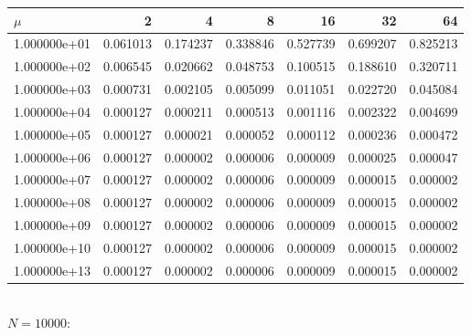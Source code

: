 \documentclass[11pt,a4paper]{report}
\begin{document}
\begin{tabular}{lrrrrrr}
\toprule
{} $\mu$&        2  &        4  &        8  &        16 &        32 &        64 \\
\midrule
1.000000e+01 &  0.061013 &  0.174237 &  0.338846 &  0.527739 &  0.699207 &  0.825213 \\
1.000000e+02 &  0.006545 &  0.020662 &  0.048753 &  0.100515 &  0.188610 &  0.320711 \\
1.000000e+03 &  0.000731 &  0.002105 &  0.005099 &  0.011051 &  0.022720 &  0.045084 \\
1.000000e+04 &  0.000127 &  0.000211 &  0.000513 &  0.001116 &  0.002322 &  0.004699 \\
1.000000e+05 &  0.000127 &  0.000021 &  0.000052 &  0.000112 &  0.000236 &  0.000472 \\
1.000000e+06 &  0.000127 &  0.000002 &  0.000006 &  0.000009 &  0.000025 &  0.000047 \\
1.000000e+07 &  0.000127 &  0.000002 &  0.000006 &  0.000009 &  0.000015 &  0.000002 \\
1.000000e+08 &  0.000127 &  0.000002 &  0.000006 &  0.000009 &  0.000015 &  0.000002 \\
1.000000e+09 &  0.000127 &  0.000002 &  0.000006 &  0.000009 &  0.000015 &  0.000002 \\
1.000000e+10 &  0.000127 &  0.000002 &  0.000006 &  0.000009 &  0.000015 &  0.000002 \\
1.000000e+13 &  0.000127 &  0.000002 &  0.000006 &  0.000009 &  0.000015 &  0.000002 \\
\bottomrule
\end{tabular}
\\
$N=10000$:
\\
\end{document}
